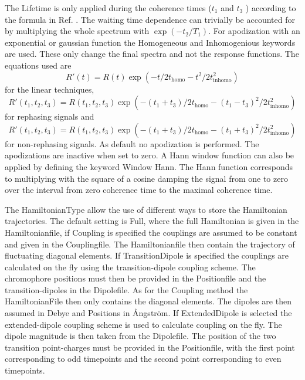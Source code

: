 The Lifetime is only applied during the coherence times ($t_1$ and $t_3$ ) according 
to the formula in Ref. . The waiting time dependence can trivially be accounted for by 
multiplying the whole spectrum with $\exp( -t_2 /T_1 )$. For apodization with an exponential or gaussian function the Homogeneous and Inhomogenious keywords are used. These only change the final spectra and not the response functions. The equations used are
\begin{equation}
R'(t)=R(t)\exp\left(-t/2 t_{\textrm{homo}}-t^2/2 t_{\textrm{inhomo}}^2\right)
\end{equation}
for the linear techniques,
\begin{equation}
R'(t_1,t_2,t_3)=R(t_1,t_2,t_3)\exp\left(-(t_1+t_3)/2 t_{\textrm{homo}}-(t_1-t_3)^2/2 t_{\textrm{inhomo}}^2\right)
\end{equation}
for rephasing signals and
\begin{equation}
R'(t_1,t_2,t_3)=R(t_1,t_2,t_3)
\exp\left(-(t_1+t_3)/2 t_{\textrm{homo}}-(t_1+t_3)^2/2 t_{\textrm{inhomo}}^2\right)
\end{equation}
for non-rephasing signals. As default no apodization is performed. The apodizations are inactive when set to zero.  
A Hann window function can also be applied by defining the keyword Window Hann. The Hann function corresponds to multiplying with the square of a cosine damping the signal from one to zero over the interval from zero coherence time to the maximal coherence time.

The HamiltonianType allow the use of different ways to store the Hamiltonian trajectories. The default setting is Full, where the full Hamiltonian is given in the Hamiltonianfile, if Coupling is specified the couplings are assumed to be constant and given in the Couplingfile. The Hamiltonianfile then contain the trajectory of fluctuating diagonal elements. If TransitionDipole is specified the couplings are calculated on the fly using the transition-dipole coupling scheme. The chromophore positions must then be provided in the Positionfile and the transition-dipoles in the Dipolefile. As for the Coupling method the HamiltonianFile then only contains the diagonal elements. The dipoles are then assumed in Debye and Positions in \AA ngstr\"{o}m. If ExtendedDipole is selected the extended-dipole coupling scheme is used to calculate coupling on the fly. The dipole magnitude is then taken from the Dipolefile. The position of the two transition point-charges must be provided in the Positionfile, with the first point corresponding to odd timepoints and the second point corresponding to even timepoints.

